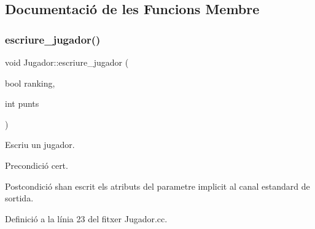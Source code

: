 \subsection{Documentació de les Funcions Membre}
\mbox{\label{class_jugador_a2649293855d738934650cd8e26011df2}} 
\subsubsection{\texorpdfstring{escriure\+\_\+jugador()}{escriure\_jugador()}}
{\footnotesize\ttfamily void Jugador\+::escriure\+\_\+jugador (\begin{DoxyParamCaption}\item[{bool}]{ranking,  }\item[{int}]{punts }\end{DoxyParamCaption})}



Escriu un jugador. 

\begin{DoxyPrecond}{Precondició}
cert. 
\end{DoxyPrecond}
\begin{DoxyPostcond}{Postcondició}
s\textquotesingle{}han escrit els atributs del parametre implicit al canal estandard de sortida. 
\end{DoxyPostcond}


Definició a la línia 23 del fitxer Jugador.\+cc.


